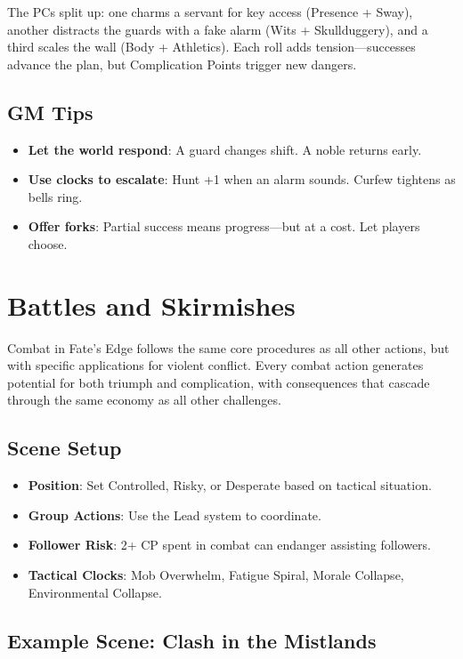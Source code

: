 The PCs split up: one charms a servant for key access (Presence + Sway), another distracts the guards with a fake alarm (Wits + Skullduggery), and a third scales the wall (Body + Athletics). Each roll adds tension—successes advance the plan, but Complication Points trigger new dangers.

\subsection*{GM Tips}

\begin{itemize}
    \item \textbf{Let the world respond}: A guard changes shift. A noble returns early.
    \item \textbf{Use clocks to escalate}: Hunt +1 when an alarm sounds. Curfew tightens as bells ring.
    \item \textbf{Offer forks}: Partial success means progress—but at a cost. Let players choose.
\end{itemize}

\section*{Battles and Skirmishes}

Combat in Fate's Edge follows the same core procedures as all other actions, but with specific applications for violent conflict. Every combat action generates potential for both triumph and complication, with consequences that cascade through the same economy as all other challenges.

\subsection*{Scene Setup}

\begin{itemize}
    \item \textbf{Position}: Set Controlled, Risky, or Desperate based on tactical situation.
    \item \textbf{Group Actions}: Use the Lead system to coordinate.
    \item \textbf{Follower Risk}: 2+ CP spent in combat can endanger assisting followers.
    \item \textbf{Tactical Clocks}: Mob Overwhelm, Fatigue Spiral, Morale Collapse, Environmental Collapse.
\end{itemize}

\subsection*{Example Scene: Clash in the Mistlands}

